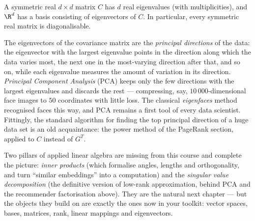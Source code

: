 \begin{fact}
A symmetric real $d\times d$ matrix $C$ has $d$ real eigenvalues (with multiplicities), and $\R^d$ has a basis
consisting of eigenvectors of $C$. In particular, every symmetric real matrix is diagonalisable.
\end{fact}

The eigenvectors of the covariance matrix are the \emph{principal directions} of the data: the eigenvector
with the largest eigenvalue points in the direction along which the data varies most, the next one in the
most-varying direction after that, and so on, while each eigenvalue measures the amount of variation in
its direction. \emph{Principal Component Analysis} (PCA) keeps only the few directions with the largest
eigenvalues and discards the rest — compressing, say, $10\,000$-dimensional face images to $50$
coordinates with little loss. The classical \emph{eigenfaces} method recognised faces this way, and PCA
remains a first tool of every data scientist. Fittingly, the standard algorithm for finding the top
principal direction of a huge data set is an old acquaintance: the power method of the PageRank section,
applied to $C$ instead of $G^T$.

\begin{remark}
Two pillars of applied linear algebra are missing from this course and complete the picture: \emph{inner
products} (which formalise angles, lengths and orthogonality, and turn ``similar embeddings'' into a
computation) and the \emph{singular value decomposition} (the definitive version of low-rank
approximation, behind PCA and the recommender factorisation above). They are the natural next chapter —
but the objects they build on are exactly the ones now in your toolkit: vector spaces, bases, matrices,
rank, linear mappings and eigenvectors.
\end{remark}
